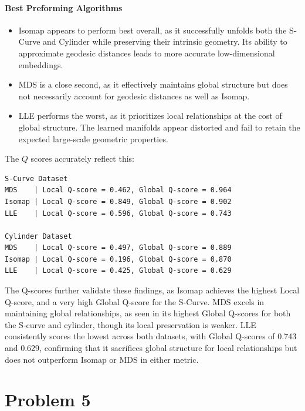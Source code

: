 \documentclass[11pt]{scrartcl}
\begin{document}
\paragraph{Best Preforming Algorithms}

\begin{itemize}
    \item Isomap appears to perform best overall, as it successfully unfolds both the S-Curve and Cylinder while preserving their intrinsic geometry. Its ability to approximate geodesic distances leads to more accurate low-dimensional embeddings.
    \item MDS is a close second, as it effectively maintains global structure but does not necessarily account for geodesic distances as well as Isomap.
    \item LLE performs the worst, as it prioritizes local relationships at the cost of global structure. The learned manifolds appear distorted and fail to retain the expected large-scale geometric properties.
\end{itemize}

The $Q$ scores accurately reflect this:

\begin{verbatim}
S-Curve Dataset
MDS    | Local Q-score = 0.462, Global Q-score = 0.964
Isomap | Local Q-score = 0.849, Global Q-score = 0.902
LLE    | Local Q-score = 0.596, Global Q-score = 0.743

Cylinder Dataset
MDS    | Local Q-score = 0.497, Global Q-score = 0.889
Isomap | Local Q-score = 0.196, Global Q-score = 0.870
LLE    | Local Q-score = 0.425, Global Q-score = 0.629
\end{verbatim}

The Q-scores further validate these findings, as Isomap achieves the highest Local Q-score, and a very high Global Q-score for the S-Curve. MDS excels in maintaining global relationships, as seen in its highest Global Q-scores for both the S-curve and cylinder, though its local preservation is weaker. LLE consistently scores the lowest across both datasets, with Global Q-scores of 0.743 and 0.629, confirming that it sacrifices global structure for local relationships but does not outperform Isomap or MDS in either metric.

\newpage

\section{Problem 5}
\end{document}
